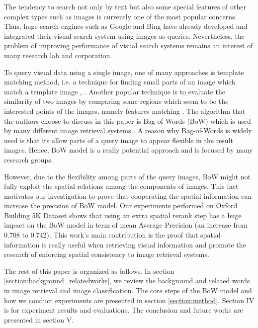 \documentclass[10pt,conference,]{IEEEtran}
\begin{document}
The tendency to search not only by text but also some special features of other complex types such as images is currently one of the most popular concerns. Thus, huge search engines such as Google and Bing have already developed and integrated their visual search system using images as queries. Nevertheless, the problem of improving performance of visual search systems remains an interest of many research lab and corporation.

To query visual data using a single image, one of many approaches is template matching method, i.e. a technique for finding small parts of an image which match a template image \cite{brunelli_template_matching}, \cite{Rosenfeld4309663, Gharavi913587}. Another popular technique is to evaluate the similarity of two images by comparing some regions which seem to be the interested points of the images, namely features matching \cite{Belongie710790, Rubner, Viola990517}. The algorithm that the authors choose to discuss in this paper is Bag-of-Words (BoW) \cite{3} which is used by many different image retrieval systems \cite{3, 2, 7}. A reason why Bag-of-Words is widely used is that its allow parts of a query image to appear flexible in the result images. Hence, BoW model is a really potential approach and is focused by many research groups.

However, due to the flexibility among parts of the query images, BoW might not fully exploit the spatial relations among the components of images. This fact motivates our investigation to prove that cooperating the spatial information can increase the precision of BoW model. Our experiments performed on Oxford Building 5K Dataset shows that using an extra spatial rerank step has a huge impact on the BoW model in term of mean Average Precision (an increase from 0.708 to 0.742). This work's main contribution is the proof that spatial information is really useful when retrieving visual information and promote the research of enforcing spatial consistency to image retrieval systems.

The rest of this paper is organized as follows. In section \ref{section:background_relatedworks}, we review the background and related words in image retrieval and image classification. The core steps of the BoW model and how we conduct experiments are presented in section \ref{section:method}. Section IV is for experiment results and evaluations. The conclusion and future works are presented in section V.
\end{document}
